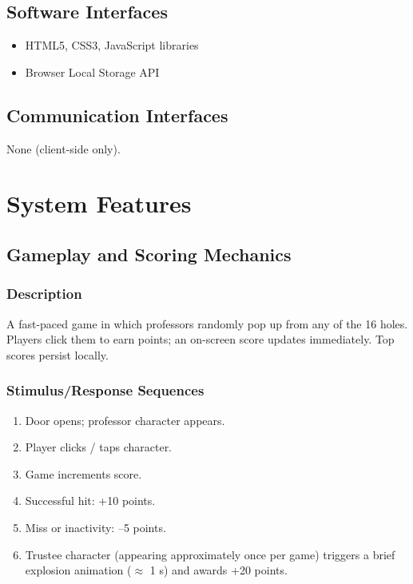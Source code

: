 \documentclass[11pt]{scrreprt}
\begin{document}
\section{Software Interfaces}
\begin{itemize}
  \item HTML5, CSS3, JavaScript libraries
  \item Browser Local Storage API
\end{itemize}

\section{Communication Interfaces}
None (client-side only).

\chapter{System Features}

\section{Gameplay and Scoring Mechanics}

\subsection{Description}
A fast-paced game in which professors randomly pop up from any of the 16 holes. Players click them to earn points; an on-screen score updates immediately. Top scores persist locally.

\subsection{Stimulus/Response Sequences}
\begin{enumerate}
  \item Door opens; professor character appears.
  \item Player clicks / taps character.
  \item Game increments score.
  \item Successful hit: +10 points.
  \item Miss or inactivity: –5 points.
  \item Trustee character (appearing approximately once per game) triggers a brief explosion animation ($\approx$ 1 s) and awards +20 points.
\end{enumerate}
\end{document}
